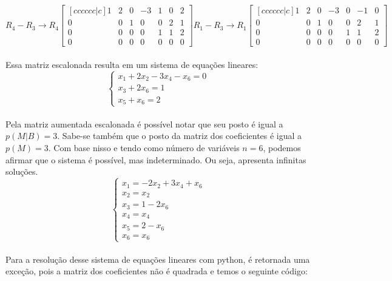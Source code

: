 \[
    R_4-R_3\to R_4
    \begin{bmatrix}[cccccc|c]
        1 & 2 & 0 & -3 & 1 & 0 & 2 \\
        0 & 0 & 1 & 0  & 0 & 2 & 1 \\
        0 & 0 & 0 & 0  & 1 & 1 & 2 \\
        0 & 0 & 0 & 0  & 0 & 0 & 0
    \end{bmatrix}
    R_1-R_3\to R_1
    \begin{bmatrix}[cccccc|c]
        1 & 2 & 0 & -3 & 0 & -1 & 0 \\
        0 & 0 & 1 & 0  & 0 & 2  & 1 \\
        0 & 0 & 0 & 0  & 1 & 1  & 2 \\
        0 & 0 & 0 & 0  & 0 & 0  & 0
    \end{bmatrix}
\]
\\

Essa matriz escalonada resulta em um sistema de equações lineares:
\\

\[
    \begin{cases}
        x_1 +2x_2  -3x_4 -x_6  = 0 \\
        x_3  +2x_6 = 1             \\
        x_5 +x_6 = 2
    \end{cases}
\]
\\

Pela matriz aumentada escalonada é possível notar que seu posto é igual a $p(M|B)=3$. Sabe-se também que o posto da matriz dos coeficientes é igual a $p(M)=3$. Com base nisso e tendo como número de variáveis $n=6$, podemos afirmar que o sistema é possível, mas indeterminado. Ou seja, apresenta infinitas soluções.\\

\begin{equation}
    \begin{cases}
        x_1=-2x_2+3 x_4+x_6 \\
        x_2=x_2             \\
        x_3=1-2x_6          \\
        x_4=x_4             \\
        x_5=2-x_6           \\
        x_6=x_6
    \end{cases}
\end{equation}
\\

Para a resolução desse sistema de equações lineares com python, é retornada uma exceção, pois a matriz dos coeficientes não é quadrada e temos o seguinte código:
\\


